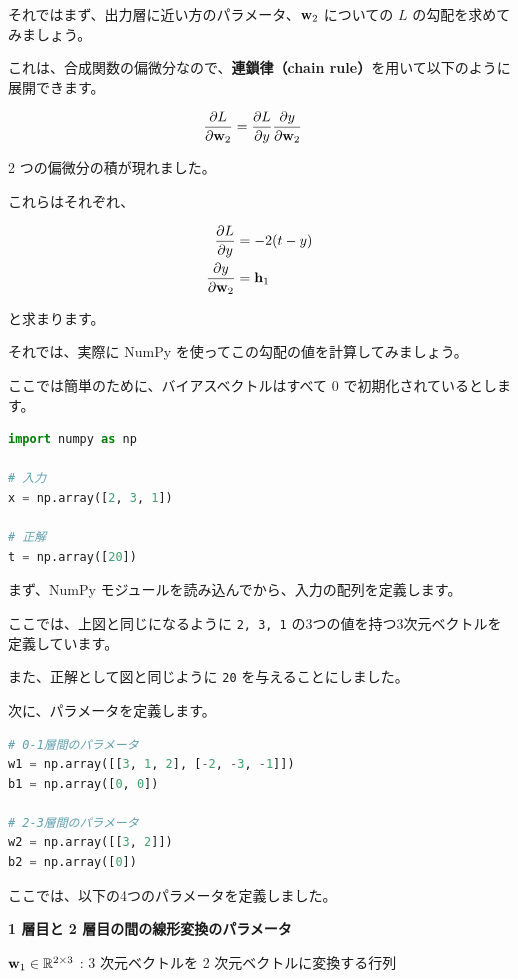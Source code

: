 それではまず、出力層に近い方のパラメータ、${\bf w}_2$ についての $L$ の勾配を求めてみましょう。

これは、合成関数の偏微分なので、\textbf{連鎖律（chain rule）}を用いて以下のように展開できます。


\[
\begin{aligned}
\frac{\partial L}{\partial {\bf w}_2}
&= \frac{\partial L}{\partial y} \frac{\partial y}{\partial {\bf w}_2}
\end{aligned}
\]


2 つの偏微分の積が現れました。

これらはそれぞれ、


\[
\begin{aligned}
\frac{\partial L}{\partial y}
&= -2(t - y) \\
\frac{\partial y}{\partial {\bf w}_2}
&= {\bf h}_1
\end{aligned}
\]


と求まります。


それでは、実際に NumPy を使ってこの勾配の値を計算してみましょう。

ここでは簡単のために、バイアスベクトルはすべて 0 で初期化されているとします。


\begin{lstlisting}[style=codecell,language=Python]
import numpy as np

# 入力
x = np.array([2, 3, 1])

# 正解
t = np.array([20])
\end{lstlisting}

まず、NumPy モジュールを読み込んでから、入力の配列を定義します。

ここでは、上図と同じになるように \texttt{2, 3, 1} の3つの値を持つ3次元ベクトルを定義しています。

また、正解として図と同じように \texttt{20} を与えることにしました。

次に、パラメータを定義します。


\begin{lstlisting}[style=codecell,language=Python]
# 0-1層間のパラメータ
w1 = np.array([[3, 1, 2], [-2, -3, -1]])
b1 = np.array([0, 0])

# 2-3層間のパラメータ
w2 = np.array([[3, 2]])
b2 = np.array([0])
\end{lstlisting}

ここでは、以下の4つのパラメータを定義しました。


\textbf{1 層目と 2 層目の間の線形変換のパラメータ}


${\bf w}_1 \in \mathbb{R}^{2 \times 3}$ : 3 次元ベクトルを 2 次元ベクトルに変換する行列


